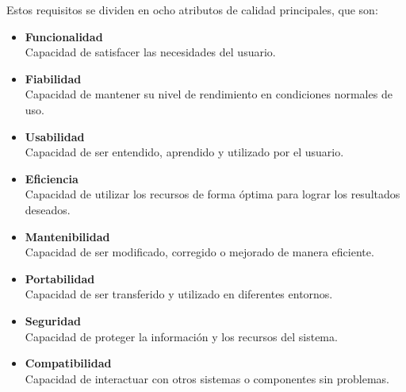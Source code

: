 Estos requisitos se dividen en ocho atributos de calidad principales, que son:
\begin{itemize}
  \item \textbf{Funcionalidad} \\
  Capacidad de satisfacer las necesidades del usuario.
  \item \textbf{Fiabilidad} \\
  Capacidad de mantener su nivel de rendimiento en condiciones normales de uso.
  \item \textbf{Usabilidad} \\
  Capacidad de ser entendido, aprendido y utilizado por el usuario.
  \item \textbf{Eficiencia} \\
  Capacidad de utilizar los recursos de forma óptima para lograr los resultados deseados.
  \item \textbf{Mantenibilidad} \\
  Capacidad de ser modificado, corregido o mejorado de manera eficiente.
  \item \textbf{Portabilidad} \\
  Capacidad de ser transferido y utilizado en diferentes entornos.
  \item \textbf{Seguridad} \\
  Capacidad de proteger la información y los recursos del sistema.
  \item \textbf{Compatibilidad} \\
  Capacidad de interactuar con otros sistemas o componentes sin problemas.
\end{itemize}
